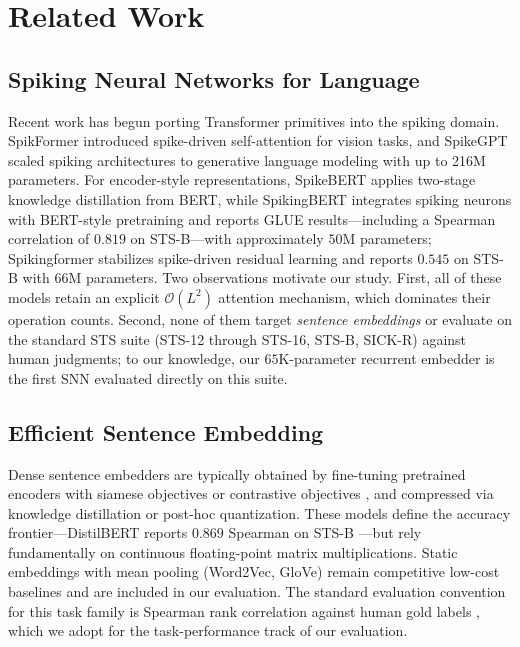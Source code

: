 \documentclass[10pt,a4paper,twoside]{article}
\begin{document}
\section{Related Work}

\subsection{Spiking Neural Networks for Language}
Recent work has begun porting Transformer primitives into the spiking domain. SpikFormer \cite{zhou2023spikformer} introduced spike-driven self-attention for vision tasks, and SpikeGPT \cite{zhu2023spikegpt} scaled spiking architectures to generative language modeling with up to 216M parameters. For encoder-style representations, SpikeBERT \cite{lv2023spikebert} applies two-stage knowledge distillation from BERT, while SpikingBERT \cite{bal2024spikingbert} integrates spiking neurons with BERT-style pretraining and reports GLUE results---including a Spearman correlation of $0.819$ on STS-B---with approximately $50$M parameters; Spikingformer \cite{zhou2025spikingformer} stabilizes spike-driven residual learning and reports $0.545$ on STS-B with $66$M parameters. Two observations motivate our study. First, all of these models retain an explicit $\mathcal{O}(L^2)$ attention mechanism, which dominates their operation counts. Second, none of them target \emph{sentence embeddings} or evaluate on the standard STS suite (STS-12 through STS-16, STS-B, SICK-R) against human judgments; to our knowledge, our $65$K-parameter recurrent embedder is the first SNN evaluated directly on this suite.

\subsection{Efficient Sentence Embedding}
Dense sentence embedders are typically obtained by fine-tuning pretrained encoders with siamese objectives \cite{reimers2019sentence} or contrastive objectives \cite{gao2021simcse}, and compressed via knowledge distillation \cite{hinton2015distilling, sanh2019distilbert, wang2020minilm} or post-hoc quantization. These models define the accuracy frontier---DistilBERT reports $0.869$ Spearman on STS-B \cite{sanh2019distilbert}---but rely fundamentally on continuous floating-point matrix multiplications. Static embeddings with mean pooling (Word2Vec, GloVe) remain competitive low-cost baselines and are included in our evaluation. The standard evaluation convention for this task family is Spearman rank correlation against human gold labels \cite{muennighoff2022mteb, cer2017semeval}, which we adopt for the task-performance track of our evaluation.
\end{document}
